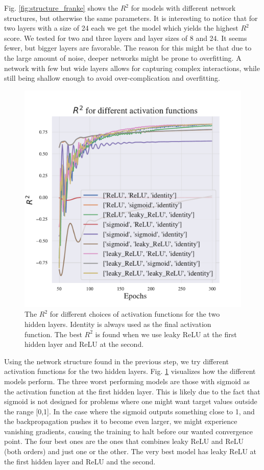 Fig. \ref{fig:structure_franke} shows the $R^2$ for models with different network structures, but otherwise the same parameters. It is interesting to notice that for two layers with a size of 24 each we get the model which yields the highest $R^2$ score. We tested for two and three layers and layer sizes of 8 and 24. 
It seems fewer, but bigger layers are favorable. 
The reason for this might be that due to the large amount of noise, deeper networks might be prone to overfitting.
A network with few but wide layers allows for capturing complex interactions, while still being shallow enough to avoid over-complication and overfitting.

\begin{figure}[h!]
    \centering
    \includegraphics[width=1.0\linewidth]{project_2/figures/$R^2$ for different activation functions_continuous.pdf}
    \caption{The $R^2$ for different choices of activation functions for the two hidden layers. Identity is always used as the final activation function. The best $R^2$ is found when we use leaky ReLU at the first hidden layer and ReLU at the second.}
    \label{fig:activation_franke}
\end{figure}

Using the network structure found in the previous step, we try different activation functions for the two hidden layers. 
Fig. \ref{fig:activation_franke} visualizes how the different models perform. 
The three worst performing models are those with sigmoid as the activation function at the first hidden layer. 
This is likely due to the fact that sigmoid is not designed for problems where one might want target values outside the range [0,1].
In the case where the sigmoid outputs something close to 1, and the backpropagation pushes it to become even larger, we might experience vanishing gradients, causing the training to halt before our wanted convergence point.
The four best ones are the ones that combines leaky ReLU and ReLU (both orders) and just one or the other. 
The very best model has leaky ReLU at the first hidden layer and ReLU and the second.

